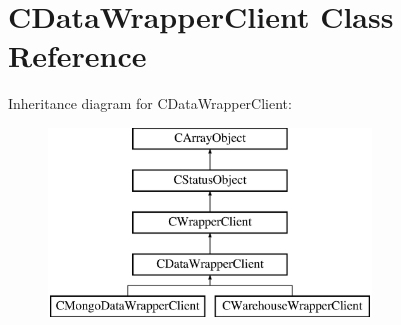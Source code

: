 \hypertarget{class_c_data_wrapper_client}{\section{C\-Data\-Wrapper\-Client Class Reference}
\label{class_c_data_wrapper_client}
}
Inheritance diagram for C\-Data\-Wrapper\-Client\-:\begin{figure}[H]
\begin{center}
\leavevmode
\includegraphics[height=5.000000cm]{class_c_data_wrapper_client}
\end{center}
\end{figure}
